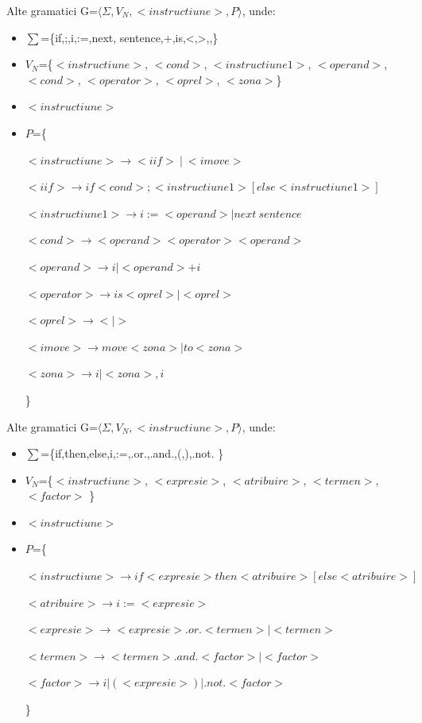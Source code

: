 \documentclass[pdf]{beamer}
\begin{document}
\begin{frame}{Alte gramatici}
G=$\langle \Sigma, V_N, <instructiune>, P \rangle$, unde:

\begin{itemize}
\item
$\sum$=\{if,;,i,:=,next, sentence,+,is,<,>,,\}
\item
$V_N$=\{$<instructiune>$, $<cond>$, $<instructiune1>$, $<operand>$, $<cond>$, $<operator>$, $<oprel>$, $<zona>$\}
\item
$<instructiune>$
\item
$P$=\{

$<instructiune> \rightarrow <iif> \ | \ <imove>$

$< iif > \rightarrow if <cond> ; <instructiune1> [else < instructiune1> ]$

$< instructiune1 > \rightarrow i := <operand> | next \ sentence  $

$<cond> \rightarrow <operand> <operator> <operand>$

$<operand> \rightarrow i |  <operand> +  i$

$<operator> \rightarrow is <oprel> |  <oprel>$

$<oprel> \rightarrow < | > $

$<imove> \rightarrow move <zona> | to <zona>$

$<zona> \rightarrow i | <zona> , i$

\}
\end{itemize}

\end{frame}



\begin{frame}{Alte gramatici}
G=$\langle \Sigma, V_N, <instructiune>, P \rangle$, unde:

\begin{itemize}
\item
$\sum$=\{if,then,else,i,:=,.or.,.and.,(,),.not. \}
\item
$V_N$=\{$<instructiune>$, $<expresie>$, $<atribuire>$, $<termen>$, $<factor>$ \}
\item
$<instructiune>$
\item
$P$=\{

$<instructiune> \rightarrow if <expresie> then <atribuire> [else < atribuire> ]  $

$<atribuire> \rightarrow i := <expresie > $

$<expresie> \rightarrow <expresie> .or. <termen> | <termen> $

$<termen> \rightarrow <termen> .and. <factor> | <factor>$

$<factor> \rightarrow i | (<expresie>) | .not. <factor>$

\}
\end{itemize}

\end{frame}
\end{document}
